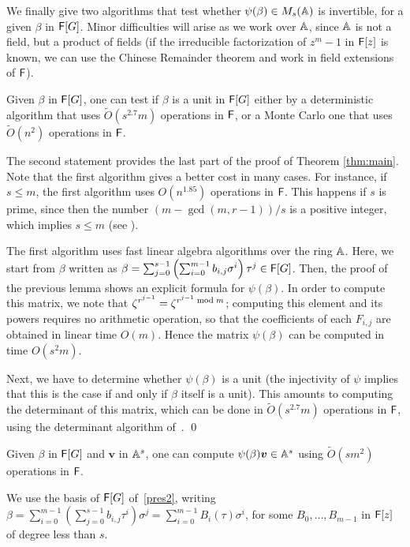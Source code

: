 We finally give two algorithms that test whether $\psi(\beta) \in
M_s(\mathbb{A})$ is invertible, for a given $\beta$ in ${\mathsf{F}}[G]$. Minor
difficulties will arise as we work over $\mathbb{A}$, since $\mathbb{A}$ is not a
field, but a product of fields (if the irreducible factorization of
$z^m-1$ in ${\mathsf{F}}[z]$ is known, we can use the Chinese Remainder theorem
and work in field extensions of ${\mathsf{F}}$).

\begin{corollary}\label{coro:test_meta}
  Given $\beta$ in ${\mathsf{F}}[G]$, one can test if $\beta$ is a unit in
  ${\mathsf{F}}[G]$ either by a deterministic algorithm that uses
  $\tilde{O}(s^{2.7} m)$ operations in ${\mathsf{F}}$, or a Monte Carlo one that
  uses $\tilde{O}(n^2)$ operations in ${\mathsf{F}}$.
\end{corollary}
The second statement provides the last part of the proof of Theorem
\ref{thm:main}. Note that the first algorithm gives a better cost in
many cases. For instance, if $s \leq m$, the first algorithm uses
$O(n^{1.85})$ operations in ${\mathsf{F}}$. This happens if $s$ is prime, since
then the number ${(m- \gcd(m,r-1))}/{s}$ is a positive integer,
which implies $s \leq m$ (see \cite[Theorem 47.12, Corollary 47.14
]{Curtis}).


  The first algorithm uses fast linear algebra algorithms over the ring
  $\mathbb{A}$. Here, we start from $\beta$ written as $\beta = \sum_{j =
    0}^{s-1} \left( \sum_{i = 0}^{m-1} b_{i,j} \sigma^i \right) \tau^j
  \in {\mathsf{F}}[G]$. Then, the proof of the previous lemma shows an explicit
  formula for $\psi(\beta)$. In order to compute this matrix, we note
  that $\zeta^{r^{j-1}} = \zeta^{r^{j-1} \bmod m}$; computing this
  element and its powers requires no arithmetic operation, so that the
  coefficients of each $F_{i,j}$ are obtained in linear time $O(m)$.
  Hence the matrix $\psi(\beta)$ can be computed in time $O(s^2m)$.

  Next, we have to determine whether $\psi(\beta)$ is a unit (the
  injectivity of $\psi$ implies that this is the case if and only if
  $\beta$ itself is a unit). This amounts to computing the determinant
  of this matrix, which can be done in $\tilde{O}(s^{2.7} m)$
  operations in ${\mathsf{F}}$, using the determinant algorithm
  of~\cite[Section~6]{KaVi04}. \qed



\begin{lemma}\label{lem:multpsi}
  Given $\beta$ in ${\mathsf{F}}[G]$ and $\boldsymbol{v}$ in $\mathbb{A}^s$, one can
  compute $\psi(\beta) \boldsymbol{v} \in \mathbb{A}^s$ using $\tilde{O}(s
  m^2)$ operations in ${\mathsf{F}}$.
\end{lemma}
  We use the basis of  ${\mathsf{F}}[G]$ of~\eqref{pres2}, writing $\beta =
  \sum_{i = 0}^{m-1} \left( \sum_{j = 0}^{s-1}  b_{i,j} \tau^i
  \right) \sigma^j = \sum_{i
    = 0}^{m-1} B_i(\tau) \sigma^i$, for some $B_0,\dots,B_{m-1}$ in
  ${\mathsf{F}}[z]$ of degree less than $s$.


